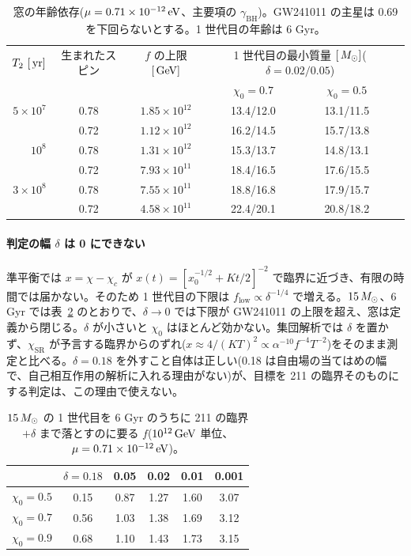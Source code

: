 \begin{table}[H]
\centering\small
\begin{tabular}{rccccc}
\toprule
$T_2\ [\yr]$ & 生まれたスピン & $f$ の上限 $[\,\mathrm{GeV}]$ & \multicolumn{2}{c}{1 世代目の最小質量 $[\,M_\odot]$($\delta=0.02/0.05$)}\\
 & & & $\chi_0=0.7$ & $\chi_0=0.5$\\
\midrule
$5\times10^7$ & 0.78 & $1.85\times10^{12}$ & 13.4/12.0 & 13.1/11.5\\
 & 0.72 & $1.12\times10^{12}$ & 16.2/14.5 & 15.7/13.8\\
$10^8$ & 0.78 & $1.31\times10^{12}$ & 15.3/13.7 & 14.8/13.1\\
 & 0.72 & $7.93\times10^{11}$ & 18.4/16.5 & 17.6/15.5\\
$3\times10^8$ & 0.78 & $7.55\times10^{11}$ & 18.8/16.8 & 17.9/15.7\\
 & 0.72 & $4.58\times10^{11}$ & 22.4/20.1 & 20.8/18.2\\
\bottomrule
\end{tabular}
\caption{窓の年齢依存($\mu=0.71\times10^{-12}\,\mathrm{eV}$、主要項の $\gamma_\mathrm{BH}$)。GW241011 の主星は 0.69 を下回らないとする。1 世代目の年齢は 6 Gyr。}
\label{tab:e12age}
\end{table}

\paragraph{判定の幅 $\delta$ は 0 にできない}
準平衡では $x=\chi-\chi_c$ が $x(t)=[x_0^{-1/2}+Kt/2]^{-2}$ で臨界に近づき、有限の時間では届かない。そのため 1 世代目の下限は $f_\mathrm{low}\propto\delta^{-1/4}$ で増える。$15\,M_\odot$、6 Gyr では表~\ref{tab:e12delta} のとおりで、$\delta\to0$ では下限が GW241011 の上限を超え、窓は定義から閉じる。$\delta$ が小さいと $\chi_0$ はほとんど効かない。集団解析では $\delta$ を置かず、$\chi_\mathrm{SR}$ が予言する臨界からのずれ($x\approx4/(KT)^2\propto\alpha^{-10}f^{-4}T^{-2}$)をそのまま測定と比べる。$\delta=0.18$ を外すこと自体は正しい(0.18 は自由場の当てはめの幅で、自己相互作用の解析に入れる理由がない)が、目標を 211 の臨界そのものにする判定は、この理由で使えない。

\begin{table}[H]
\centering\small
\begin{tabular}{rccccc}
\toprule
 & $\delta=0.18$ & 0.05 & 0.02 & 0.01 & 0.001\\
\midrule
$\chi_0=0.5$ & 0.15 & 0.87 & 1.27 & 1.60 & 3.07\\
$\chi_0=0.7$ & 0.56 & 1.03 & 1.38 & 1.69 & 3.12\\
$\chi_0=0.9$ & 0.68 & 1.10 & 1.43 & 1.73 & 3.15\\
\bottomrule
\end{tabular}
\caption{$15\,M_\odot$ の 1 世代目を 6 Gyr のうちに 211 の臨界 $+\delta$ まで落とすのに要る $f$($10^{12}\,\mathrm{GeV}$ 単位、$\mu=0.71\times10^{-12}\,\mathrm{eV}$)。}
\label{tab:e12delta}
\end{table}

